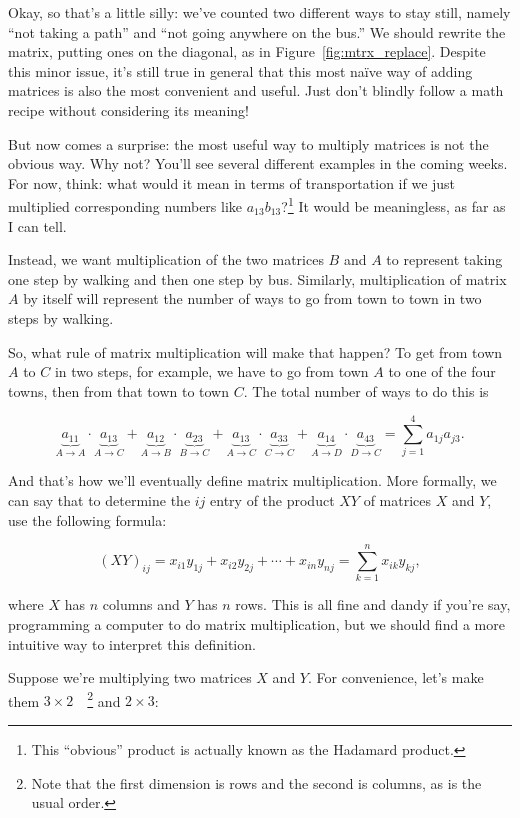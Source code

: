 \documentclass[../gatm.tex]{subfiles}
\begin{document}
\noindent Okay, so that's a little silly: we've counted two different ways to stay still, namely ``not taking a path'' and ``not going anywhere on the bus.'' We should rewrite the matrix, putting ones on the diagonal, as in Figure~\ref{fig:mtrx_replace}. Despite this minor issue, it's still true in general that this most naïve way of adding matrices is also the most convenient and useful. Just don't blindly follow a math recipe without considering its meaning!

But now comes a surprise: the most useful way to multiply matrices is not the obvious way. Why not? You'll see several different examples in the coming weeks. For now, think: what would it mean in terms of transportation if we just multiplied corresponding numbers like $a_{13}b_{13}$?\footnote{This ``obvious'' product is actually known as the Hadamard product.} It would be meaningless, as far as I can tell.

Instead, we want multiplication of the two matrices $B$ and $A$ to represent taking one step by walking and then one step by bus. Similarly, multiplication of matrix $A$ by itself will represent the number of ways to go from town to town in two steps by walking.

So, what rule of matrix multiplication will make that happen? To get from town $A$ to $C$ in two steps, for example, we have to go from town $A$ to one of the four towns, then from that town to town $C$. The total number of ways to do this is

$$\underbrace{a_{11}}_{A\to A}\cdot \underbrace{a_{13}}_{A\to C}+\underbrace{a_{12}}_{A\to B}\cdot \underbrace{a_{23}}_{B\to C}+\underbrace{a_{13}}_{A\to C}\cdot \underbrace{a_{33}}_{C\to C}+\underbrace{a_{14}}_{A\to D}\cdot \underbrace{a_{43}}_{D\to C}=\sum_{j=1}^{4}a_{1j}a_{j3}.$$

\noindent And that's how we'll eventually define matrix multiplication. More formally, we can say that to determine the $ij$ entry of the product $XY$ of matrices $X$ and $Y$, use the following formula:

$$(XY)_{ij}=x_{i1}y_{1j}+x_{i2}y_{2j}+\cdots + x_{in}y_{nj} = \sum_{k=1}^n x_{ik} y_{kj},$$

\noindent where $X$ has $n$ columns and $Y$ has $n$ rows. This is all fine and dandy if you're say, programming a computer to do matrix multiplication, but we should find a more intuitive way to interpret this definition.

Suppose we're multiplying two matrices $X$ and $Y$. For convenience, let's make them $3\times 2\quad$\footnote{Note that the first dimension is rows and the second is columns, as is the usual order.} and $2\times 3$:
\end{document}
